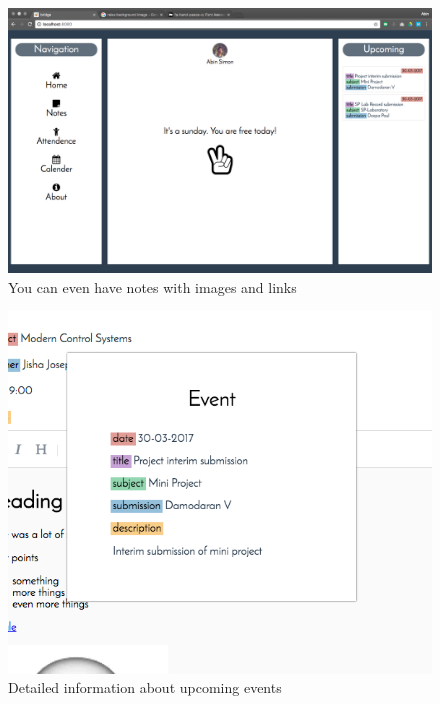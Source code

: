 \begin{figure}[htb]
    \centering
    \includegraphics[width=\linewidth]{holiday.png}
    \caption{You can even have notes with images and links}
    \label{fig:holiday} %
\end{figure}

\begin{figure}[htb]
    \centering
    \includegraphics[width=\linewidth]{eventinfo.png}
    \caption{Detailed information about upcoming events}
    \label{fig:eventinfo} %
\end{figure}

